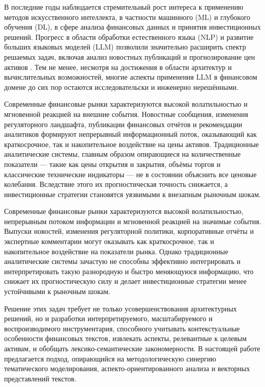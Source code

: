 В последние годы наблюдается стремительный рост интереса к применению методов искусственного интеллекта,
в частности машинного (ML) и глубокого обучения (DL), в сфере анализа финансовых данных и принятия
инвестиционных решений. Прогресс в области обработки естественного языка (NLP) и развитие больших языковых
моделей (LLM) позволили значительно расширить спектр решаемых задач, включая анализ новостных публикаций
и прогнозирование цен активов \parencite{Jiang2023, Halder2022, Kim2023}. Тем не менее, несмотря
на достижения в области архитектур и вычислительных возможностей, многие аспекты применения
LLM в финансовом домене до сих пор остаются исследовательски и инженерно нерешёнными.

Современные финансовые рынки характеризуются высокой волатильностью и мгновенной реакцией
на внешние события. Новостные сообщения, изменения регуляторного ландшафта, публикации
финансовых отчётов и рекомендации аналитиков формируют непрерывный информационный поток,
оказывающий как краткосрочное, так и накопительное воздействие на цены активов.
Традиционные аналитические системы, главным образом опирающиеся на количественные
показатели --- такие как цены открытия и закрытия, объёмы торгов и классические технические
индикаторы --- не в состоянии объяснить все ценовые колебания. Вследствие этого их
прогностическая точность снижается, а инвестиционные стратегии становятся уязвимыми
к внезапным рыночным шокам.

Современные финансовые рынки характеризуются высокой волатильностью, непрерывным потоком информации
и мгновенной реакцией на значимые события. Выпуски новостей, изменения регуляторной политики, корпоративные
отчёты и экспертные комментарии могут оказывать как краткосрочное, так и накопительное воздействие на показатели
рынка. Однако традиционные аналитические системы зачастую не способны эффективно интегрировать и интерпретировать
такую разнородную и быстро меняющуюся информацию, что снижает их прогностическую силу и делает инвестиционные
стратегии менее устойчивыми к рыночным шокам.

Решение этих задач требует не только усовершенствования архитектурных решений, но и разработки интерпретируемого,
масштабируемого и воспроизводимого инструментария, способного учитывать контекстуальные особенности финансовых
текстов, извлекать аспекты, релевантные к целевым активам, и обобщать лексико-семантические закономерности.
В настоящей работе предлагается подход, опирающийся на методологическую синергию тематического моделирования,
аспекто-ориентированного анализа и векторных представлений текстов.


